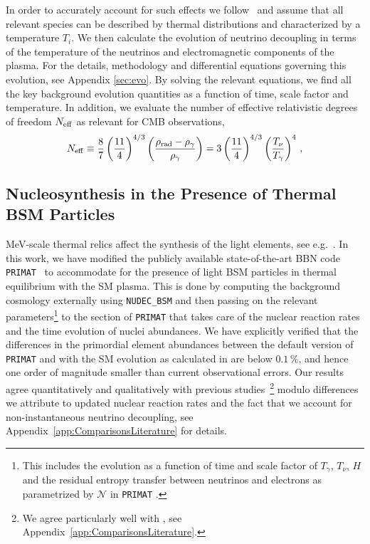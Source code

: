 In order to accurately account for such effects we follow~\cite{Escudero:2018mvt} and assume that all relevant species can be described by thermal distributions and characterized by a temperature $T_i$. We then calculate the evolution of neutrino decoupling in terms of the temperature of the neutrinos and electromagnetic components of the plasma. For the details, methodology and differential equations governing this evolution, see Appendix \ref{sec:evo}. By solving the relevant equations, we find all the key background evolution quantities as a function of time, scale factor and temperature. In addition, we evaluate the number of effective relativistic degrees of freedom $N_{\rm eff}$ as relevant for CMB observations,
\begin{align}\label{eq:Neff}
N_{\rm eff} \equiv \frac{8}{7}\left(\frac{11}{4} \right)^{4/3} \left( \frac{\rho_{\text{rad}}-\rho_\gamma}{\rho_\gamma}\right) = 3 \left(\frac{11}{4} \right)^{4/3} \left(\frac{T_\nu}{T_\gamma}\right)^4 \, ,
\end{align}


\subsection{Nucleosynthesis in the Presence of Thermal BSM Particles}\label{sec:earlyUniverse_method}

MeV-scale thermal relics affect the synthesis of the light elements, see e.g.~\cite{Kolb:1986nf,Serpico:2004nm,Boehm:2013jpa,Nollett:2013pwa,Nollett:2014lwa}. In this work, we have modified the publicly available state-of-the-art BBN code \texttt{PRIMAT}~\cite{Pitrou:2018cgg} to accommodate for the presence of light BSM particles in thermal equilibrium with the SM plasma. This is done by computing the background cosmology externally using \texttt{NUDEC\_BSM} \cite{Escudero:2018mvt,Escudero:2019new} and then passing on the relevant parameters\footnote{This includes the evolution as a function of time and scale factor of $T_\gamma$, $T_\nu$, $H$ and the residual entropy transfer between neutrinos and electrons as parametrized by $\mathcal{N}$ in \texttt{PRIMAT} \cite{Pitrou:2018cgg}.} to the section of \texttt{PRIMAT} that takes care of the nuclear reaction rates and the time evolution of nuclei abundances. We have explicitly verified that the differences in the primordial element abundances between the default version of \texttt{PRIMAT} and with the SM evolution as calculated in \cite{Escudero:2018mvt,Escudero:2019new} are below $0.1\,\%$, and hence one order of magnitude smaller than current observational errors. Our results agree quantitatively and qualitatively with previous studies~\cite{Kolb:1986nf,Serpico:2004nm,Boehm:2013jpa,Nollett:2013pwa,Nollett:2014lwa}\footnote{We agree particularly well with \cite{Nollett:2013pwa,Nollett:2014lwa}, see Appendix~\ref{app:ComparisonsLiterature}. } modulo differences we attribute to updated nuclear reaction rates and the fact that we account for non-instantaneous neutrino decoupling, see Appendix~\ref{app:ComparisonsLiterature} for details.

